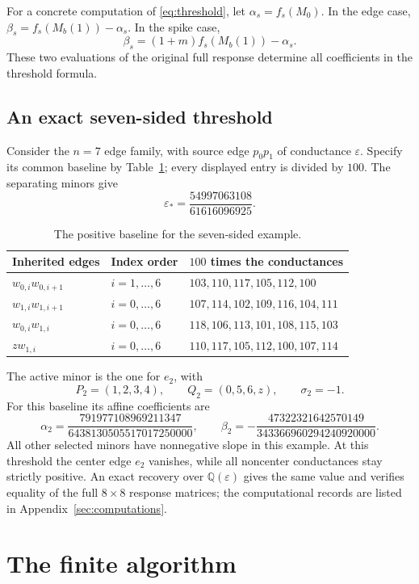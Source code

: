 \documentclass[11pt]{article}
\theoremstyle{definition}
\begin{document}
For a concrete computation of \eqref{eq:threshold}, let
$\alpha_s=f_s(M_0)$. In the edge case,
$\beta_s=f_s(M_b(1))-\alpha_s$. In the spike case,
\[
 \beta_s=(1+m)f_s(M_b(1))-\alpha_s.
\]
These two evaluations of the original full response determine all
coefficients in the threshold formula.

\subsection{An exact seven-sided threshold}
\label{sec:checks}

Consider the $n=7$ edge family, with source edge $p_0p_1$ of
conductance $\varepsilon$. Specify its common baseline by
Table~\ref{tab:baseline}; every displayed entry is divided by $100$.
The separating minors give
\[
 \varepsilon_* = \frac{54997063108}{61616096925}.
\]
\begin{table}[htbp]
\centering
\begin{tabular}{@{}lll@{}}
\toprule
Inherited edges & Index order & $100$ times the conductances\\
\midrule
$w_{0,i}w_{0,i+1}$ & $i=1,\ldots,6$ & $103,110,117,105,112,100$\\
$w_{1,i}w_{1,i+1}$ & $i=0,\ldots,6$ & $107,114,102,109,116,104,111$\\
$w_{0,i}w_{1,i}$ & $i=0,\ldots,6$ & $118,106,113,101,108,115,103$\\
$zw_{1,i}$ & $i=0,\ldots,6$ & $110,117,105,112,100,107,114$\\
\bottomrule
\end{tabular}
\caption{The positive baseline for the seven-sided example.}
\label{tab:baseline}
\end{table}
The active minor is the one for $e_2$, with
\[
 P_2=(1,2,3,4),\qquad Q_2=(0,5,6,z),\qquad \sigma_2=-1.
\]
For this baseline its affine coefficients are
\[
 \alpha_2=\frac{791977108969211347}{6438130505517017250000},
 \qquad
 \beta_2=-\frac{47322321642570149}{343366960294240920000}.
\]
All other selected minors have nonnegative slope in this example.
At this threshold the center edge $e_2$ vanishes, while all
noncenter conductances stay strictly positive. An exact recovery over
$\mathbb Q(\varepsilon)$ gives the same value and verifies equality
of the full $8\times8$ response matrices; the computational records
are listed in Appendix~\ref{sec:computations}.

\appendix

\section{The finite algorithm}
\label{sec:algorithm}
\end{document}
